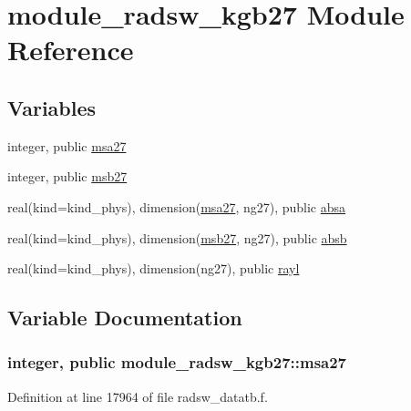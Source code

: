 \hypertarget{namespacemodule__radsw__kgb27}{}\section{module\+\_\+radsw\+\_\+kgb27 Module Reference}
\label{namespacemodule__radsw__kgb27}
\subsection*{Variables}
\begin{DoxyCompactItemize}
\item 
integer, public \hyperlink{namespacemodule__radsw__kgb27_abdab838f66aba14b64bce733f797cf26}{msa27}
\item 
integer, public \hyperlink{group__module__radsw__main_ga3b2e57a0d4596aead5cad5aaca74850d}{msb27}
\item 
real(kind=kind\+\_\+phys), dimension(\hyperlink{namespacemodule__radsw__kgb27_abdab838f66aba14b64bce733f797cf26}{msa27}, ng27), public \hyperlink{group__module__radsw__main_ga300726e54369a14bfbe6b486f5aab01b}{absa}
\item 
real(kind=kind\+\_\+phys), dimension(\hyperlink{group__module__radsw__main_ga3b2e57a0d4596aead5cad5aaca74850d}{msb27}, ng27), public \hyperlink{group__module__radsw__main_ga8edb349c908e6950e0d18f293dd1b6ea}{absb}
\item 
real(kind=kind\+\_\+phys), dimension(ng27), public \hyperlink{group__module__radsw__main_gaca4c6e06d1cd46568048a035c6726f1d}{rayl}
\end{DoxyCompactItemize}


\subsection{Variable Documentation}
\subsubsection[{\texorpdfstring{msa27}{msa27}}]{\setlength{\rightskip}{0pt plus 5cm}integer, public module\+\_\+radsw\+\_\+kgb27\+::msa27}\hypertarget{namespacemodule__radsw__kgb27_abdab838f66aba14b64bce733f797cf26}{}\label{namespacemodule__radsw__kgb27_abdab838f66aba14b64bce733f797cf26}


Definition at line 17964 of file radsw\+\_\+datatb.\+f.

